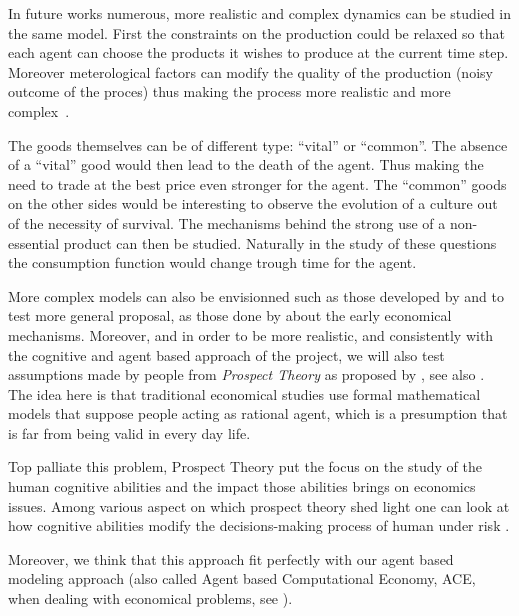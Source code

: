\documentclass{wscpaperproc}
\begin{document}

In future works numerous, more realistic and complex dynamics can be studied in the same model. First the constraints on the production could be relaxed so that each agent can choose the products it wishes to produce at the current time step. Moreover meterological factors can modify the quality of the production (noisy outcome of the proces) thus making the process more realistic and more complex~\cite{bentley_specialisation_2005}.

The goods themselves can be of different type: ``vital'' or ``common''. The absence of a ``vital'' good would then lead to the death of the agent. Thus making the need to trade at the best price even stronger for the agent. The ``common'' goods on the other sides would be interesting to observe the evolution of a culture out of the necessity of survival. The mechanisms behind the strong use of a non-essential product can then be studied. Naturally in the study of these questions the consumption function would change trough time for the agent.

More complex models can also be envisionned such as those developed by 
\cite{rubinstein_equilibrium_1985} and to test more general proposal, as those done by \cite{polanyi_trade_1957,polanyi_livelihood_1977} about the early economical mechanisms. Moreover, and in order to be more realistic, and consistently with the cognitive and agent based approach of the project, we will also test assumptions made by people from \emph{Prospect Theory} as proposed by 
\cite{kahneman_prospect_1979}, see also
\cite{camerer_prospect_2004}. The idea here is that traditional economical studies use formal mathematical models that suppose people acting as rational agent, which is a presumption that is far from being valid  in every day life. 

Top palliate this problem, Prospect Theory put the focus on the study of the human cognitive abilities and the impact those abilities brings on economics issues. Among various aspect on which prospect theory shed light one can look at how cognitive abilities modify the decisions-making process of human under risk
\cite{weber_disposition_1998}.

Moreover, we think that this approach fit perfectly with our agent based modeling approach (also called Agent based Computational Economy, ACE, when dealing with economical problems, see
\cite{tesfatsion_introduction_2001}).
\end{document}

